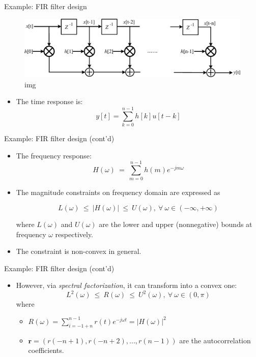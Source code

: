 \documentclass[10pt,ignorenonframetext,serif,onlymath]{beamer}
\providecommand{\tightlist}{%
  \setlength{\itemsep}{0pt}\setlength{\parskip}{0pt}}
\begin{document}
\begin{frame}{Example: FIR filter design}
\protect\hypertarget{sec:example-fir-filter-design}{}

\begin{figure}
\centering
\includegraphics{ellipsoid.files/fir_strctr.pdf}
\caption{img}
\end{figure}

\begin{itemize}
\tightlist
\item
  The time response is: \[y[t] = \sum_{k=0}^{n-1}{h[k]u[t-k]}\]
\end{itemize}

\end{frame}

\begin{frame}{Example: FIR filter design (cont’d)}
\protect\hypertarget{sec:example-fir-filter-design-contd}{}

\begin{itemize}
\item
  The frequency response:
  \[H(\omega)~=~\sum_{m=0}^{n-1}{h(m)e^{-jm\omega}}\]
\item
  The magnitude constraints on frequency domain are expressed as

  \[L(\omega)~\leq~|H(\omega)|~\leq~U(\omega),~\forall~\omega\in(-\infty,+\infty)\]

  where \(L(\omega)\) and \(U(\omega)\) are the lower and upper
  (nonnegative) bounds at frequency \(\omega\) respectively.
\item
  The constraint is non-convex in general.
\end{itemize}

\end{frame}

\begin{frame}{Example: FIR filter design (cont’d)}
\protect\hypertarget{sec:example-fir-filter-design-contd-1}{}

\begin{itemize}
\tightlist
\item
  However, via \emph{spectral factorization}, it can transform into a
  convex one:
  \[L^2(\omega)~\leq~R(\omega)~\leq~U^2(\omega),~\forall~\omega\in(0,\pi)\]
  where

  \begin{itemize}
  \tightlist
  \item
    \(R(\omega)=\sum_{i=-1+n}^{n-1}{r(t)e^{-j{\omega}t}}=|H(\omega)|^2\)
  \item
    \(\mathbf{r}=(r(-n+1),r(-n+2),...,r(n-1))\) are the autocorrelation
    coefficients.
  \end{itemize}
\end{itemize}

\end{frame}
\end{document}
